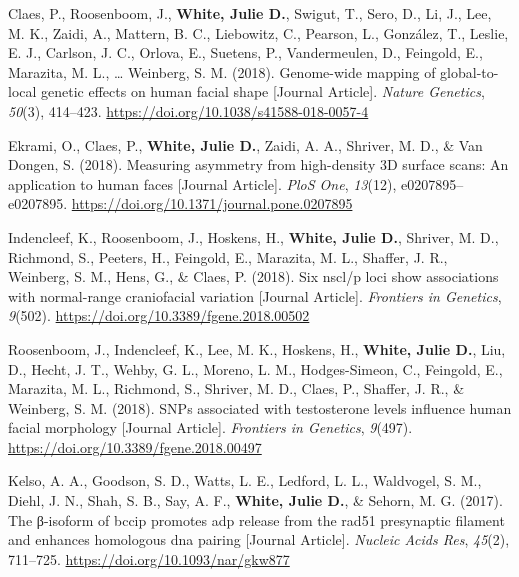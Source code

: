 \documentclass[11pt, a4paper]{awesome-cv}
\begin{document}
\leavevmode\hypertarget{ref-Claes_2018_GlobalToLocal}{}%
Claes, P., Roosenboom, J., \textbf{White, Julie D.}, Swigut, T., Sero,
D., Li, J., Lee, M. K., Zaidi, A., Mattern, B. C., Liebowitz, C.,
Pearson, L., González, T., Leslie, E. J., Carlson, J. C., Orlova, E.,
Suetens, P., Vandermeulen, D., Feingold, E., Marazita, M. L., \ldots{}
Weinberg, S. M. (2018). Genome-wide mapping of global-to-local genetic
effects on human facial shape {[}Journal Article{]}. \emph{Nature
Genetics}, \emph{50}(3), 414--423.
\url{https://doi.org/10.1038/s41588-018-0057-4}

\leavevmode\hypertarget{ref-Ekrami_2018_MeasuringAsymmetry}{}%
Ekrami, O., Claes, P., \textbf{White, Julie D.}, Zaidi, A. A., Shriver,
M. D., \& Van Dongen, S. (2018). Measuring asymmetry from high-density
3D surface scans: An application to human faces {[}Journal Article{]}.
\emph{PloS One}, \emph{13}(12), e0207895--e0207895.
\url{https://doi.org/10.1371/journal.pone.0207895}

\leavevmode\hypertarget{ref-Indencleef_2018_SixNSCLP}{}%
Indencleef, K., Roosenboom, J., Hoskens, H., \textbf{White, Julie D.},
Shriver, M. D., Richmond, S., Peeters, H., Feingold, E., Marazita, M.
L., Shaffer, J. R., Weinberg, S. M., Hens, G., \& Claes, P. (2018). Six
nscl/p loci show associations with normal-range craniofacial variation
{[}Journal Article{]}. \emph{Frontiers in Genetics}, \emph{9}(502).
\url{https://doi.org/10.3389/fgene.2018.00502}

\leavevmode\hypertarget{ref-Rosenboom_2018_Testosterone}{}%
Roosenboom, J., Indencleef, K., Lee, M. K., Hoskens, H., \textbf{White,
Julie D.}, Liu, D., Hecht, J. T., Wehby, G. L., Moreno, L. M.,
Hodges-Simeon, C., Feingold, E., Marazita, M. L., Richmond, S., Shriver,
M. D., Claes, P., Shaffer, J. R., \& Weinberg, S. M. (2018). SNPs
associated with testosterone levels influence human facial morphology
{[}Journal Article{]}. \emph{Frontiers in Genetics}, \emph{9}(497).
\url{https://doi.org/10.3389/fgene.2018.00497}

\leavevmode\hypertarget{ref-Kelso_2017_BCCIP}{}%
Kelso, A. A., Goodson, S. D., Watts, L. E., Ledford, L. L., Waldvogel,
S. M., Diehl, J. N., Shah, S. B., Say, A. F., \textbf{White, Julie D.},
\& Sehorn, M. G. (2017). The β-isoform of bccip promotes adp release
from the rad51 presynaptic filament and enhances homologous dna pairing
{[}Journal Article{]}. \emph{Nucleic Acids Res}, \emph{45}(2), 711--725.
\url{https://doi.org/10.1093/nar/gkw877}

\endgroup
\end{document}
